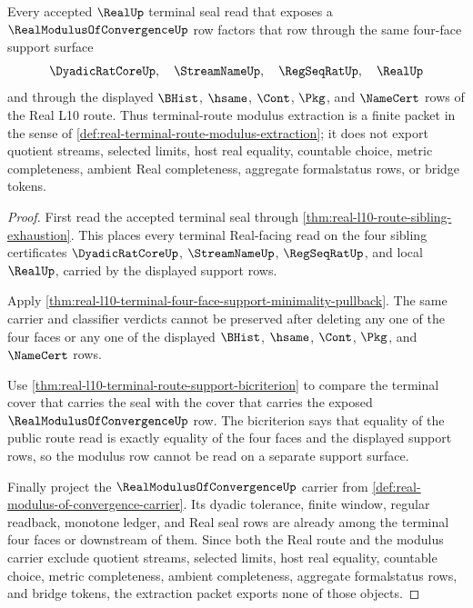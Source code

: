 \begin{theorem}
\label{thm:real-terminal-route-modulus-extraction}
Every accepted $\RealUp$ terminal seal read that exposes a
$\RealModulusOfConvergenceUp$ row factors that row through the same four-face
support surface
$$
\DyadicRatCoreUp,\quad \StreamNameUp,\quad \RegSeqRatUp,\quad \RealUp
$$
and through the displayed $\BHist$, $\hsame$, $\Cont$, $\Pkg$, and
$\NameCert$ rows of the Real L10 route. Thus terminal-route modulus extraction
is a finite packet in the sense of
\autoref{def:real-terminal-route-modulus-extraction}; it does not export
quotient streams, selected limits, host real equality, countable choice,
metric completeness, ambient Real completeness, aggregate formalstatus rows,
or bridge tokens.
\end{theorem}
\begin{proof}
First read the accepted terminal seal through
\autoref{thm:real-l10-route-sibling-exhaustion}. This places every terminal
Real-facing read on the four sibling certificates $\DyadicRatCoreUp$,
$\StreamNameUp$, $\RegSeqRatUp$, and local $\RealUp$, carried by the displayed
support rows.

Apply
\autoref{thm:real-l10-terminal-four-face-support-minimality-pullback}. The
same carrier and classifier verdicts cannot be preserved after deleting any
one of the four faces or any one of the displayed $\BHist$, $\hsame$, $\Cont$,
$\Pkg$, and $\NameCert$ rows.

Use \autoref{thm:real-l10-terminal-route-support-bicriterion} to compare the
terminal cover that carries the seal with the cover that carries the exposed
$\RealModulusOfConvergenceUp$ row. The bicriterion says that equality of the
public route read is exactly equality of the four faces and the displayed
support rows, so the modulus row cannot be read on a separate support surface.

Finally project the $\RealModulusOfConvergenceUp$ carrier from
\autoref{def:real-modulus-of-convergence-carrier}. Its dyadic tolerance,
finite window, regular readback, monotone ledger, and Real seal rows are
already among the terminal four faces or downstream of them. Since both the
Real route and the modulus carrier exclude quotient streams, selected limits,
host real equality, countable choice, metric completeness, ambient
completeness, aggregate formalstatus rows, and bridge tokens, the extraction
packet exports none of those objects.
\end{proof}

